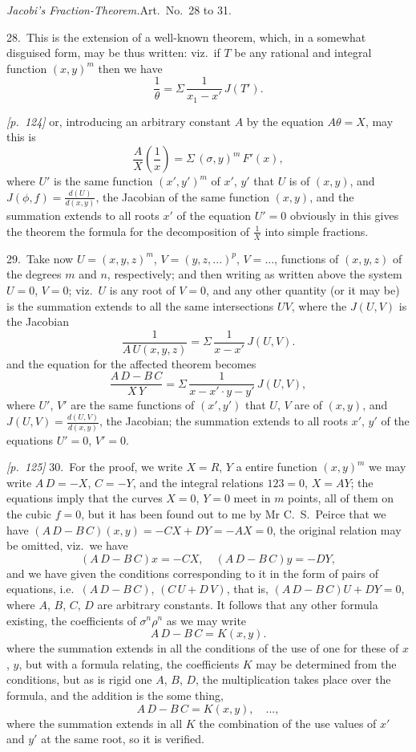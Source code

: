 \documentclass[11pt,a4paper]{article}
\theoremstyle{plain}
\theoremstyle{definition}
\theoremstyle{remark}
\begin{document}
\textit{Jacobi's Fraction-Theorem.}\quad Art.\ No.~28 to 31.

28.\ This is the extension of a well-known theorem, which, in a somewhat disguised form, may be thus written: viz.\ if $T$ be any rational and integral function $(x, y)^m$ then we have
\[
\frac{1}{\theta} = \Sigma\,\frac{1}{x_1 - x'}\,J(T').
\]

\noindent\textit{[p.~124]} or, introducing an arbitrary constant $A$ by the equation $A\theta = X$, may this is
\[
\frac{A}{X}\left(\frac{1}{x}\right) = \Sigma\,(\sigma, y)^{m}\,F'(x),
\]
where $U'$ is the same function $(x', y')^m$ of $x'$, $y'$ that $U$ is of $(x, y)$, and $J(\phi, f) = \frac{d(U)}{d(x, y)}$, the Jacobian of the same function $(x, y)$, and the summation extends to all roots $x'$ of the equation $U' = 0$ obviously in this gives the theorem the formula for the decomposition of $\frac{1}{X}$ into simple fractions.

29.\ Take now $U = (x, y, z)^m$, $V = (y, z, ...)^p$, $V = ...$, functions of $(x, y, z)$ of the degrees $m$ and $n$, respectively; and then writing as written above the system $U = 0$, $V = 0$; viz.\ $U$ is any root of $V = 0$, and any other quantity (or it may be) is the summation extends to all the same intersections $UV$, where the $J(U, V)$ is the Jacobian
\[
\frac{1}{A\,U(x, y, z)} = \Sigma\,\frac{1}{x - x'}\,J(U, V).
\]
and the equation for the affected theorem becomes
\[
\frac{A\,D - B\,C}{X\,Y} = \Sigma\,\frac{1}{x - x'\cdot y - y'}\,J(U, V),
\]
where $U'$, $V'$ are the same functions of $(x', y')$ that $U$, $V$ are of $(x, y)$, and $J(U, V) = \frac{d(U, V)}{d(x, y)}$, the Jacobian; the summation extends to all roots $x'$, $y'$ of the equations $U' = 0$, $V' = 0$.

\noindent\textit{[p.~125]} 30.\ For the proof, we write $X = R$, $Y$ a entire function $(x, y)^m$ we may write $A\,D = -X$, $C = -Y$, and the integral relations $123 = 0$, $X = AY$; the equations imply that the curves $X = 0$, $Y = 0$ meet in $m$ points, all of them on the cubic $f = 0$, but it has been found out to me by Mr C.\ S.\ Peirce that we have $(A\,D - B\,C)(x, y) = -CX + DY = -AX = 0$, the original relation may be omitted, viz.\ we have
\[
(A\,D - B\,C)x = -CX,\quad (A\,D - B\,C)y = -DY,
\]
and we have given the conditions corresponding to it in the form of pairs of equations, i.e.\ $(A\,D - B\,C)$, $(C\,U + D\,V)$, that is, $(A\,D - B\,C)U + DY = 0$, where $A$, $B$, $C$, $D$ are arbitrary constants. It follows that any other formula existing, the coefficients of $\sigma^n \rho^n$ as we may write
\[
A\,D - B\,C = K(x, y).
\]
where the summation extends in all the conditions of the use of one for these of $x$, $y$, but with a formula relating, the coefficients $K$ may be determined from the conditions, but as is rigid one $A$, $B$, $D$, the multiplication takes place over the formula, and the addition is the some thing,
\[
A\,D - B\,C = K(x, y), \quad ...,
\]
where the summation extends in all $K$ the combination of the use values of $x'$ and $y'$ at the same root, so it is verified.
\end{document}
